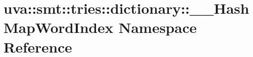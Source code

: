 \hypertarget{namespaceuva_1_1smt_1_1tries_1_1dictionary_1_1_____hash_map_word_index}{}\section{uva\+:\+:smt\+:\+:tries\+:\+:dictionary\+:\+:\+\_\+\+\_\+\+Hash\+Map\+Word\+Index Namespace Reference}
\label{namespaceuva_1_1smt_1_1tries_1_1dictionary_1_1_____hash_map_word_index}

